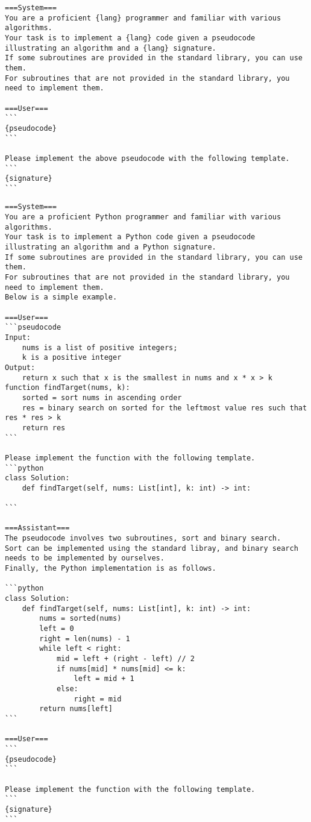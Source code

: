 \begin{figure*}
\centering
\footnotesize
\begin{lstlisting}
===System===
You are a proficient {lang} programmer and familiar with various algorithms.
Your task is to implement a {lang} code given a pseudocode illustrating an algorithm and a {lang} signature.
If some subroutines are provided in the standard library, you can use them.
For subroutines that are not provided in the standard library, you need to implement them.

===User===
```
{pseudocode}
```

Please implement the above pseudocode with the following template.
```
{signature}
```
\end{lstlisting}
\label{lst:query-prompt-zero}
\end{figure*}

\begin{figure*}
\centering
\footnotesize
\begin{lstlisting}
===System===
You are a proficient Python programmer and familiar with various algorithms.
Your task is to implement a Python code given a pseudocode illustrating an algorithm and a Python signature.
If some subroutines are provided in the standard library, you can use them.
For subroutines that are not provided in the standard library, you need to implement them.
Below is a simple example.

===User===
```pseudocode
Input:
    nums is a list of positive integers;
    k is a positive integer
Output:
    return x such that x is the smallest in nums and x * x > k
function findTarget(nums, k):
    sorted = sort nums in ascending order
    res = binary search on sorted for the leftmost value res such that res * res > k
    return res
```

Please implement the function with the following template.
```python
class Solution:
    def findTarget(self, nums: List[int], k: int) -> int:
        
```

===Assistant===
The pseudocode involves two subroutines, sort and binary search.
Sort can be implemented using the standard libray, and binary search needs to be implemented by ourselves.
Finally, the Python implementation is as follows.

```python
class Solution:
    def findTarget(self, nums: List[int], k: int) -> int:
        nums = sorted(nums)
        left = 0
        right = len(nums) - 1
        while left < right:
            mid = left + (right - left) // 2
            if nums[mid] * nums[mid] <= k:
                left = mid + 1
            else:
                right = mid
        return nums[left]
```

===User===
```
{pseudocode}
```

Please implement the function with the following template.
```
{signature}
```
\end{lstlisting}
\label{lst:query-prompt-one}
\end{figure*}
